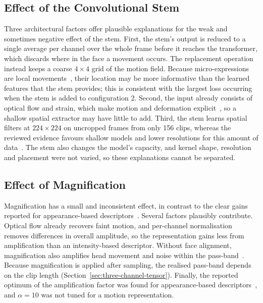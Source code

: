 \subsection{Effect of the Convolutional Stem}
\label{sec:cnn-interpretation-result}

Three architectural factors offer plausible explanations for the weak and sometimes negative effect of the stem. First, the stem's output is reduced to a single average per channel over the whole frame before it reaches the transformer, which discards where in the face a movement occurs. The replacement operation instead keeps a coarse $4\times4$ grid of the motion field. Because micro-expressions are local movements~\cite{ben2021}, their location may be more informative than the learned features that the stem provides; this is consistent with the largest loss occurring when the stem is added to configuration 2. Second, the input already consists of optical flow and strain, which make motion and deformation explicit~\cite{liong2019b}, so a shallow spatial extractor may have little to add. Third, the stem learns spatial filters at $224\times224$ on uncropped frames from only 156 clips, whereas the reviewed evidence favours shallow models and lower resolutions for this amount of data~\cite{xia2020b,li2022survey}. The stem also changes the model's capacity, and kernel shape, resolution and placement were not varied, so these explanations cannot be separated.

\subsection{Effect of Magnification}
\label{sec:evm-interpretation-result}

Magnification has a small and inconsistent effect, in contrast to the clear gains reported for appearance-based descriptors~\cite{liX2018,bai2021}. Several factors plausibly contribute. Optical flow already recovers faint motion, and per-channel normalisation removes differences in overall amplitude, so the representation gains less from amplification than an intensity-based descriptor. Without face alignment, magnification also amplifies head movement and noise within the pass-band~\cite{liX2018}. Because magnification is applied after sampling, the realised pass-band depends on the clip length (Section~\ref{sec:three-channel-tensor}). Finally, the reported optimum of the amplification factor was found for appearance-based descriptors~\cite{liX2018}, and $\alpha = 10$ was not tuned for a motion representation.

